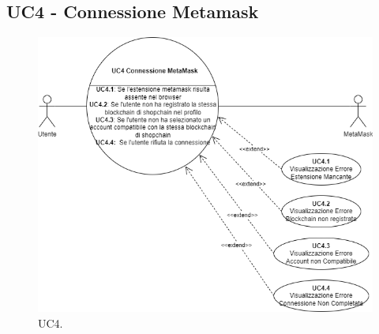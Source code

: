 \subsection{UC4 - Connessione Metamask}

\begin{figure}[H]
    \centering
    \includegraphics[scale=0.7]{immagini/UseCases-UC4.png}
    \caption{UC4.}
  \end{figure}

